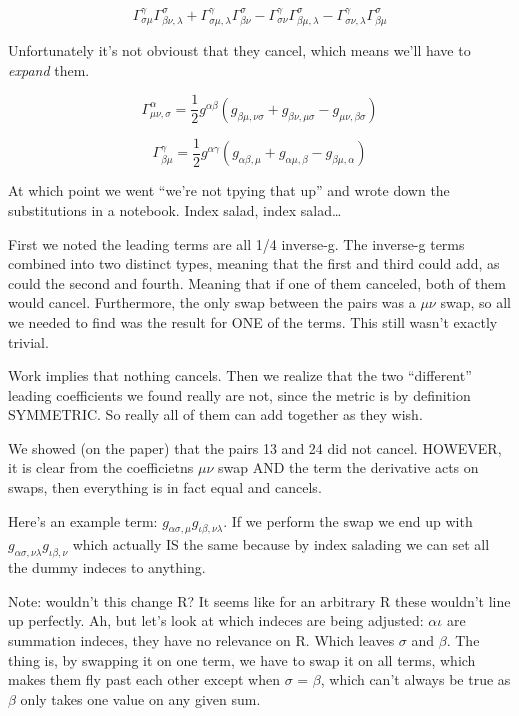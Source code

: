 \documentclass[landscape,letterpaper,10pt,english]{article}
\begin{document}
\[ \Gamma^\gamma_{\sigma\mu} \Gamma^\sigma_{\beta\nu,\lambda} + \Gamma^\gamma_{\sigma\mu,\lambda} \Gamma^\sigma_{\beta\nu} - \Gamma^\gamma_{\sigma\nu} \Gamma^\sigma_{\beta\mu,\lambda} - \Gamma^\gamma_{\sigma\nu,\lambda} \Gamma^\sigma_{\beta\mu} \]

Unfortunately it's not obvioust that they cancel, which means we'll have
to \emph{expand} them.

\[ \Gamma^\alpha_{\mu\nu,\sigma}  = \frac12 g^{\alpha\beta} \left( g_{\beta\mu,\nu\sigma} + g_{\beta\nu,\mu\sigma} - g_{\mu\nu,\beta\sigma} \right) \]

\[ \Gamma^\gamma_{\beta\mu} = \frac{1}{2} g^{\alpha\gamma} (g_{\alpha\beta,\mu} + g_{\alpha\mu,\beta} - g_{\beta\mu,\alpha})  \]

At which point we went ``we're not tpying that up'' and wrote down the
substitutions in a notebook. Index salad, index salad\ldots{}

    First we noted the leading terms are all 1/4 inverse-g. The inverse-g
terms combined into two distinct types, meaning that the first and third
could add, as could the second and fourth. Meaning that if one of them
canceled, both of them would cancel. Furthermore, the only swap between
the pairs was a \(\mu\nu\) swap, so all we needed to find was the result
for ONE of the terms. This still wasn't exactly trivial.

Work implies that nothing cancels. Then we realize that the two
``different'' leading coefficients we found really are not, since the
metric is by definition SYMMETRIC. So really all of them can add
together as they wish.

We showed (on the paper) that the pairs 13 and 24 did not cancel.
HOWEVER, it is clear from the coefficietns \(\mu\nu\) swap AND the term
the derivative acts on swaps, then everything is in fact equal and
cancels.

Here's an example term:
\(g_{\alpha\sigma,\mu}g_{\iota\beta,\nu\lambda}\). If we perform the
swap we end up with \(g_{\alpha\sigma,\nu\lambda}g_{\iota\beta,\nu}\)
which actually IS the same because by index salading we can set all the
dummy indeces to anything.

Note: wouldn't this change R? It seems like for an arbitrary R these
wouldn't line up perfectly. Ah, but let's look at which indeces are
being adjusted: \(\alpha\iota\) are summation indeces, they have no
relevance on R. Which leaves \(\sigma\) and \(\beta\). The thing is, by
swapping it on one term, we have to swap it on all terms, which makes
them fly past each other except when \(\sigma\) = \(\beta\), which can't
always be true as \(\beta\) only takes one value on any given sum.
\end{document}
